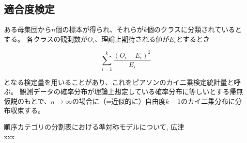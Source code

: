 \documentclass[10pt, a4paper]{ltjsarticle}
\begin{document}
\subsection{適合度検定}

ある母集団から$n$個の標本が得られ、それらが$k$個のクラスに分類されているとする。
各クラスの観測数が$O_i$、理論上期待される値が$E_i$とするとき

\begin{equation}
  \sum_{i=1}^k \frac{(O_i-E_i)^2}{E_i}
\end{equation}

となる検定量を用いることがあり、これをピアソンのカイ二乗検定統計量と呼ぶ。
観測データの確率分布が理論上想定している確率分布に等しいとする帰無仮説のもとで、$n\to\infty$の場合に（=近似的に）自由度$k-1$のカイ二乗分布に分布収束する。



\begin{thebibliography}{99}
    順序カテゴリの分割表における準対称モデルについて, 広津 \\
   xxx 
\end{thebibliography}
\end{document}
